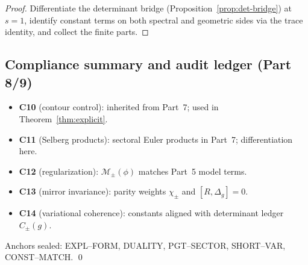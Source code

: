 \begin{proof}
Differentiate the determinant bridge (Proposition~\ref{prop:det-bridge}) at $s=1$, identify constant terms on both spectral and geometric sides via the trace identity, and collect the finite parts.  %
\end{proof}


\subsection{Compliance summary and audit ledger (Part 8/9)}
\label{subsec:ch6-part8-compliance} \relax \hspace{0pt}
\begin{remark}
\label{rem:part8-compliance}
\begin{itemize}[leftmargin=7mm]
  \item \textbf{C10} (contour control): inherited from Part~7; used in Theorem~\ref{thm:explicit}.
  \item \textbf{C11} (Selberg products): sectoral Euler products in Part~7; differentiation here.
  \item \textbf{C12} (regularization): $\mathcal M_\pm(\phi)$ matches Part~5 model terms.
  \item \textbf{C13} (mirror invariance): parity weights $\chi_\pm$ and $[R,\Delta_g]=0$.
  \item \textbf{C14} (variational coherence): constants aligned with determinant ledger $C_\pm(g)$.
\end{itemize}
Anchors sealed: \textsf{EXPL–FORM}, \textsf{DUALITY}, \textsf{PGT–SECTOR},
\textsf{SHORT–VAR}, \textsf{CONST–MATCH}. \qed
{} %
\end{remark}


